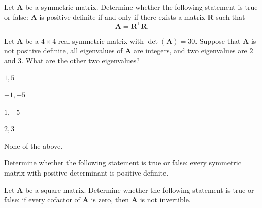 \begin{problem}
Let $\mathbf A$ be a symmetric matrix. Determine whether the following statement is true or false: $\mathbf A$ is positive definite if and only if there exists a matrix $\mathbf R$ such that
\[
\mathbf A=\mathbf R^{\mathsf T}\mathbf R.
\]
\end{problem}

\begin{problem}
Let $\mathbf A$ be a $4\times4$ real symmetric matrix with $\det(\mathbf A)=30$. Suppose that $\mathbf A$ is not positive definite, all eigenvalues of $\mathbf A$ are integers, and two eigenvalues are $2$ and $3$. What are the other two eigenvalues?
\begin{problemchoices}
\item $1,5$
\item $-1,-5$
\item $1,-5$
\item $2,3$
\item None of the above.
\end{problemchoices}
\end{problem}

\begin{problem}
Determine whether the following statement is true or false: every symmetric matrix with positive determinant is positive definite.
\end{problem}

\begin{problem}
Let $\mathbf A$ be a square matrix. Determine whether the following statement is true or false: if every cofactor of $\mathbf A$ is zero, then $\mathbf A$ is not invertible.
\end{problem}

